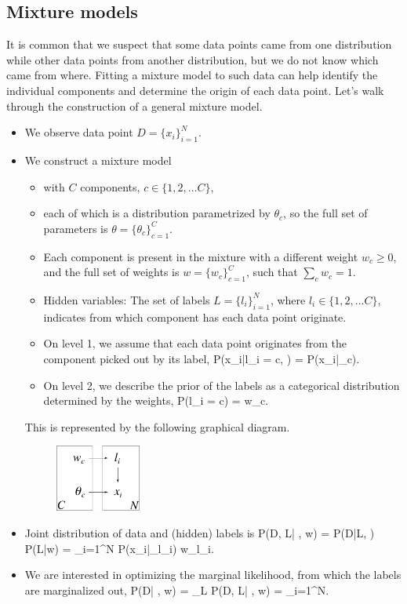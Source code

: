 \subsection{Mixture models}
It is common that we suspect that some data points came from one distribution while other data points from another distribution, but we do not know which came from where. Fitting a mixture model to such data can help identify the individual components and determine the origin of each data point. Let's walk through the construction of a general mixture model.
\begin{itemize}
	\item We observe data point $D=\{x_i\}_{i=1}^N$.
	\item We construct a mixture model
		\begin{itemize}
			\item with $C$ components, $c \in \{1, 2, \ldots C\}$,
			\item each of which is a distribution parametrized by $\theta_c$, so the full set of parameters is $\theta = \{\theta_c\}_{c=1}^C$.
			\item Each component is present in the mixture with a different weight $w_c \geq 0$, and the full set of weights is $w = \{w_c\}_{c=1}^C$, such that $\sum_c w_c = 1$.
		
			\item Hidden variables: The set of labels $L = \{l_i\}_{i=1}^N$, where $l_i\in \{1, 2, \ldots C\}$, indicates from which component has each data point originate.
			\item On level 1, we assume that each data point originates from the component picked out by its label, 
			\be
				P(x_i\;|\;l_i = c, \theta) = P(x_i\;|\;\theta_c).
			\ee
			\item On level 2, we describe the prior of the labels as a categorical distribution determined by the weights, 
			\be	
				P(l_i = c) = w_c.
			\ee
		\end{itemize}
		This is represented by the following graphical diagram.
	\begin{figure}[h]
	\centering
		\includegraphics[height=22mm]{./figs/05-mixture.pdf}
	\end{figure}
	\item Joint distribution of data and (hidden) labels is
	\be
		P(D, L\;|\; \theta, w) = P(D\;|\;L, \theta) \;P(L\;|\;w) = \prod_{i=1}^N P(x_i\;|\;\theta_{l_i})\; w_{l_i}.
	\ee
	\item We are interested in optimizing the marginal likelihood, from which the labels are marginalized out,
	\be
		P(D\;|\; \theta, w) = \sum_L P(D, L\;|\; \theta, w) = \prod_{i=1}^N\left[\sum_{c=1}^C w_c\, P(x_i\;|\;\theta_c) \right].
	\ee


\end{itemize}
